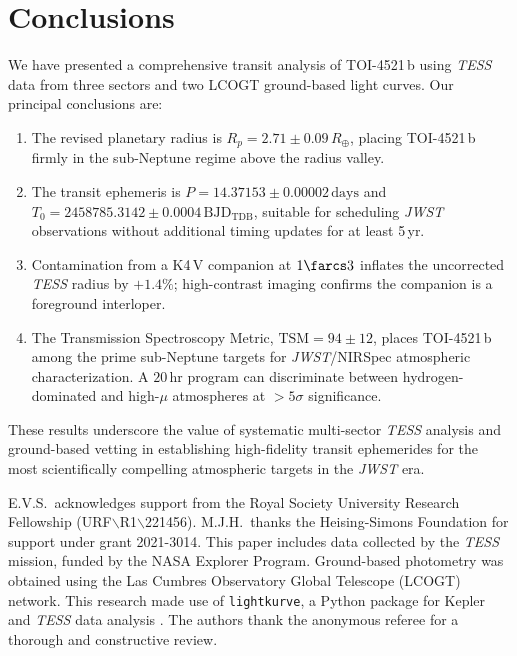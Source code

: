 \section{Conclusions}
\label{sec:conclusions}

We have presented a comprehensive transit analysis of TOI-4521\,b using
\textit{TESS} data from three sectors and two LCOGT ground-based light
curves.  Our principal conclusions are:

\begin{enumerate}
\item The revised planetary radius is $R_p = 2.71 \pm 0.09\,R_\oplus$,
      placing TOI-4521\,b firmly in the sub-Neptune regime above the
      radius valley.

\item The transit ephemeris is $P = 14.37153 \pm 0.00002\,\mathrm{days}$
      and $T_0 = 2458785.3142 \pm 0.0004\,\mathrm{BJD}_\mathrm{TDB}$,
      suitable for scheduling \textit{JWST} observations without
      additional timing updates for at least 5\,yr.

\item Contamination from a K4\,V companion at $1\farcs3$ inflates the
      uncorrected \textit{TESS} radius by $+1.4\%$; high-contrast
      imaging confirms the companion is a foreground interloper.

\item The Transmission Spectroscopy Metric, $\mathrm{TSM} = 94 \pm 12$,
      places TOI-4521\,b among the prime sub-Neptune targets for
      \textit{JWST}/NIRSpec atmospheric characterization.  A $20\,\mathrm{hr}$
      program can discriminate between hydrogen-dominated and high-$\mu$
      atmospheres at $>5\sigma$ significance.
\end{enumerate}

These results underscore the value of systematic multi-sector
\textit{TESS} analysis and ground-based vetting in establishing
high-fidelity transit ephemerides for the most scientifically
compelling atmospheric targets in the \textit{JWST} era.

\begin{acknowledgments}
E.V.S.\ acknowledges support from the Royal Society University Research
Fellowship (URF$\backslash$R1$\backslash$221456).  M.J.H.\ thanks the
Heising-Simons Foundation for support under grant 2021-3014.  This
paper includes data collected by the \textit{TESS} mission, funded by
the NASA Explorer Program.  Ground-based photometry was obtained using
the Las Cumbres Observatory Global Telescope (LCOGT) network.  This
research made use of \texttt{lightkurve}, a Python package for Kepler
and \textit{TESS} data analysis \citep{Lightkurve2018}.  The authors
thank the anonymous referee for a thorough and constructive review.
\end{acknowledgments}

